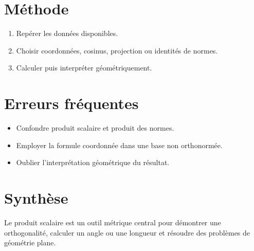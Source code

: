 \section{Méthode}
\begin{enumerate}
\item Repérer les données disponibles.
\item Choisir coordonnées, cosinus, projection ou identités de normes.
\item Calculer puis interpréter géométriquement.
\end{enumerate}

\section{Erreurs fréquentes}
\begin{itemize}
\item Confondre produit scalaire et produit des normes.
\item Employer la formule coordonnée dans une base non orthonormée.
\item Oublier l’interprétation géométrique du résultat.
\end{itemize}

\section{Synthèse}
Le produit scalaire est un outil métrique central pour démontrer une orthogonalité, calculer un angle ou une longueur et résoudre des problèmes de géométrie plane.
